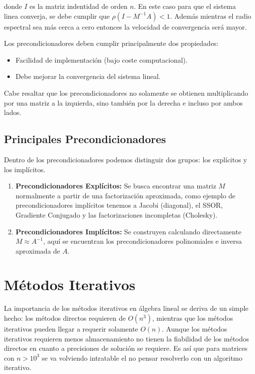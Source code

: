 \documentclass[11pt,letterpaper]{article}
\begin{document}
donde $I$ es la matriz indentidad de orden $n$. En este caso para que el sistema linea converja, se debe cumplir que $\rho(I - M^{-1}A) < 1$. Además mientras el radio espectral sea más cerca a cero entonces la velocidad de convergencia será mayor. 

\vspace{0.2cm}
Los precondicionadores deben cumplir principalmente dos propiedades:
\begin{itemize}
\item Facilidad de implementación (bajo coste computacional).
\item Debe mejorar la convergencia del sistema lineal.
\end{itemize}

Cabe resaltar que los precondicionadores no solamente se obtienen multiplicando por una matriz a la izquierda, sino también por la derecha e incluso por ambos lados.

\subsection{Principales Precondicionadores}

Dentro de los precondicionadores podemos distinguir dos grupos: los explícitos y los implícitos.

\begin{enumerate}
\item \textbf{Precondicionadores Explícitos:} Se busca encontrar una matriz $M$ normalmente a partir de una factorización aproximada, como ejemplo de precondicionadores implícitos tenemos a Jacobi (diagonal), el SSOR, Gradiente Conjugado y las factorizaciones incompletas (Cholesky).

\item \textbf{Precondicionadores Implícitos:} Se construyen calculando directamente $M \approx A^{-1}$, aquí se encuentran los precondicionadores polinomiales e inversa aproximada de $A$.
\end{enumerate}
 

\section{Métodos Iterativos}


La importancia de los métodos iterativos en álgebra lineal se deriva de un simple hecho: los métodos directos requieren de $O(n^{3})$, mientras que los métodos iterativos pueden llegar a requerir solamente $O(n)$. Aunque los métodos iterativos requieren menos almacenamiento no tienen la fiabilidad de los métodos directos en cuanto a precisiones de solución se requiere. Es así que para matrices con $n > 10^{3}$ se va volviendo intratable el no pensar resolverlo con un algoritmo iterativo.
\end{document}
